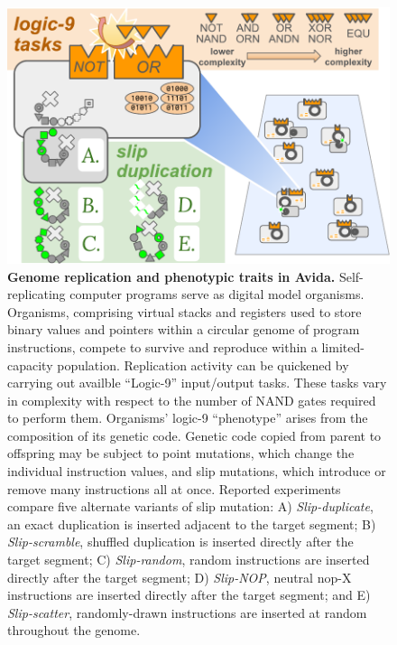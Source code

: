 \begin{figure}[!ht]
  \centering
  \includegraphics[width=\linewidth]{imgs/GeneDupeOps.pdf}
    \caption{%
 \textbf{Genome replication and phenotypic traits in Avida.}
 \footnotesize
 Self-replicating computer programs serve as digital model organisms.
 Organisms, comprising virtual stacks and registers used to store binary values and pointers within a circular genome of program instructions, compete to survive and reproduce within a limited-capacity population.
 Replication activity can be quickened by carrying out availble ``Logic-9'' input/output tasks.
 These tasks vary in complexity with respect to the number of NAND gates required to perform them.
 Organisms' logic-9 ``phenotype'' arises from the composition of its genetic code.
 Genetic code copied from parent to offspring may be subject to point mutations, which change the individual instruction values, and slip mutations, which introduce or remove many instructions all at once.
 Reported experiments compare five alternate variants of slip mutation:
 A) \textit{Slip-duplicate}, an exact duplication is inserted adjacent to the target segment;
 B) \textit{Slip-scramble}, shuffled duplication is inserted directly after the target segment;
 C) \textit{Slip-random}, random instructions are inserted directly after the target segment;
 D) \textit{Slip-NOP}, neutral nop-X instructions are inserted directly after the target segment; and
 E) \textit{Slip-scatter}, randomly-drawn instructions are inserted at random throughout the genome.
 }
    \label{fig:slip_mut_variants}
\end{figure}
